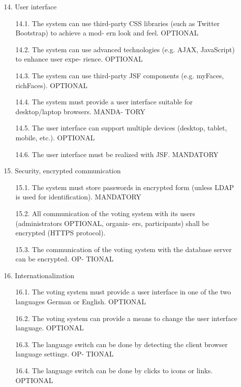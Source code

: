 \begin{enumerate}

\item[14.] User interface

	\begin{enumerate}
	\item[14.1.] The system can use third-party CSS libraries (such as Twitter Bootstrap) to achieve a mod-
	ern look and feel. OPTIONAL
	\item[14.2.] The system can use advanced technologies (e.g. AJAX, JavaScript) to enhance user expe-
	rience. OPTIONAL
	\item[14.3.] The system can use third-party JSF components (e.g. myFaces, richFaces). OPTIONAL
	\item[14.4.] The system must provide a user interface suitable for desktop/laptop browsers. MANDA-
	TORY
	\item[14.5.] The user interface can support multiple devices (desktop, tablet, mobile, etc.). OPTIONAL
	\item[14.6.] The user interface must be realized with JSF. MANDATORY
	\end{enumerate}

\item[15.] Security, encrypted communication

	\begin{enumerate}
	\item[15.1.] The system must store passwords in encrypted form (unless LDAP is used for
	identification). MANDATORY
	\item[15.2.] All communication of the voting system with its users (administrators OPTIONAL, organiz-
	ers, participants) shall be encrypted (HTTPS protocol).
	\item[15.3.] The communication of the voting system with the database server can be encrypted. OP-
	TIONAL
	\end{enumerate}

\item[16.] Internationalization

	\begin{enumerate}
	
	\item[16.1.] The voting system must provide a user interface in one of the two languages German or
	English. OPTIONAL
	\item[16.2.] The voting system can provide a means to change the user interface language. OPTIONAL
	\item[16.3.] The language switch can be done by detecting the client browser language settings. OP-
	TIONAL
	\item[16.4.] The language switch can be done by clicks to icons or links. OPTIONAL
	

\end{enumerate}
\end{enumerate}
